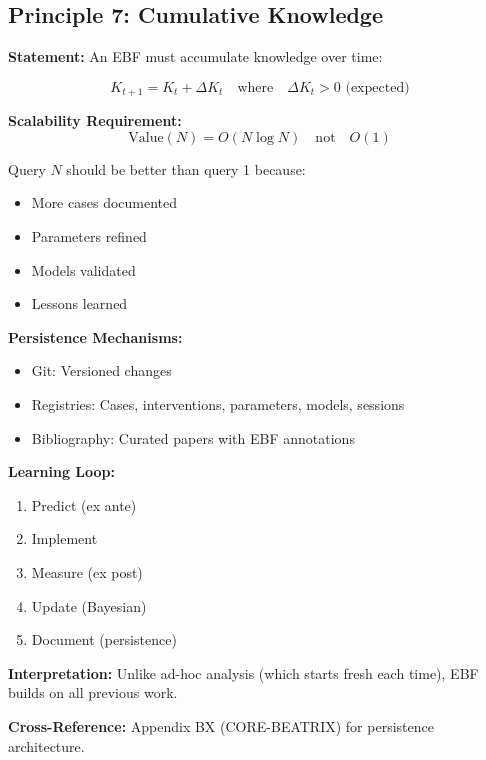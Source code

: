 \subsection{Principle 7: Cumulative Knowledge}

\begin{tcolorbox}[colback=gray!5!white, colframe=gray!75!black,
    title=Axiom PR-7: Knowledge Accumulation]

\textbf{Statement:} An EBF must accumulate knowledge over time:

\begin{equation}
K_{t+1} = K_t + \Delta K_t \quad \text{where} \quad \Delta K_t > 0 \text{ (expected)}
\end{equation}

\textbf{Scalability Requirement:}
\begin{equation}
\text{Value}(N) = O(N \log N) \quad \text{not} \quad O(1)
\end{equation}

Query $N$ should be better than query 1 because:
\begin{itemize}[nosep]
    \item More cases documented
    \item Parameters refined
    \item Models validated
    \item Lessons learned
\end{itemize}

\textbf{Persistence Mechanisms:}
\begin{itemize}[nosep]
    \item Git: Versioned changes
    \item Registries: Cases, interventions, parameters, models, sessions
    \item Bibliography: Curated papers with EBF annotations
\end{itemize}

\textbf{Learning Loop:}
\begin{enumerate}
    \item Predict (ex ante)
    \item Implement
    \item Measure (ex post)
    \item Update (Bayesian)
    \item Document (persistence)
\end{enumerate}

\textbf{Interpretation:} Unlike ad-hoc analysis (which starts fresh each time), EBF builds on all previous work.

\textbf{Cross-Reference:} Appendix BX (CORE-BEATRIX) for persistence architecture.

\end{tcolorbox}


